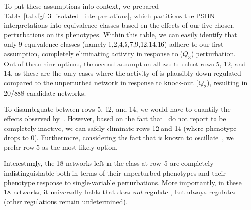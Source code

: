 To put these assumptions into context, we prepared Table~\ref{tab:fgfr3_isolated_interpretations}, 
which partitions the PSBN interpretations into equivalence classes based on the effects of our five 
chosen perturbations on its phenotypes. Within this table, we can easily identify that only 9 equivalence classes 
(namely 1,2,4,5,7,9,12,14,16) adhere to our first assumption, completely eliminating  activity in response 
to  ($Q_3$) perturbation. Out of these nine options, the second assumption allows to select rows 
5, 12, and 14, as these are the only cases where the activity of  is plausibly down-regulated compared to 
the unperturbed network in response to  knock-out ($Q_2$), resulting in 20/888 candidate networks. 

To disambiguate between rows 5, 12, and 14, we would have to quantify the effects observed by~\cite{Fafilek2018}. 
However, based on the fact that~\cite{Fafilek2018} do not report  to be completely inactive, 
we can safely eliminate rows 12 and 14 (where  phenotype drops to 0). 
Furthermore, considering the fact that  is known to oscillate~\citep{Raina2022}, 
we prefer row 5 as the most likely option. 

Interestingly, the 18 networks left in the class at row~5 are completely indistinguishable both in terms of their 
unperturbed phenotypes and their phenotype response to single-variable perturbations. 
More importantly, in these 18 networks, it universally holds that  does \emph{not} regulate
, but  always regulates  (other regulations remain undetermined). 



 

